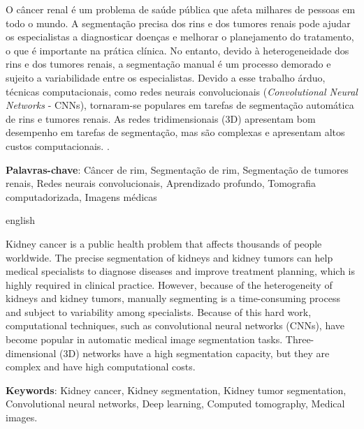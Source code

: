\documentclass[
	12pt,				%
	oneside,			%
	a4paper,			%
	english,			%
	french,				%
	spanish,			%
	brazil				%
	]{abntex2}
\begin{document}

\setlength{\absparsep}{18pt} %

\begin{resumo}

O câncer renal é um problema de saúde pública que afeta milhares de pessoas em todo o mundo. A segmentação precisa dos rins e dos tumores renais pode ajudar os especialistas a diagnosticar doenças e melhorar o planejamento do tratamento, o que é importante na prática clínica. No entanto, devido à heterogeneidade dos rins e dos tumores renais, a segmentação manual é um processo demorado e sujeito a variabilidade entre os especialistas. Devido a esse trabalho árduo, técnicas computacionais, como redes neurais convolucionais (\textit{Convolutional Neural Networks} - CNNs), tornaram-se populares em tarefas de segmentação automática de rins e tumores renais. As redes tridimensionais (3D) apresentam bom desempenho em tarefas de segmentação, mas são complexas e apresentam altos custos computacionais. .

\textbf{Palavras-chave}: Câncer de rim, Segmentação de rim, Segmentação de tumores renais, Redes neurais convolucionais, Aprendizado profundo, Tomografia computadorizada, Imagens médicas
\end{resumo}


\begin{resumo}[Abstract]
\begin{otherlanguage*}{english}

Kidney cancer is a public health problem that affects thousands of people worldwide. The precise segmentation of kidneys and kidney tumors can help medical specialists to diagnose diseases and improve treatment planning, which is highly required in clinical practice. However, because of the heterogeneity of kidneys and kidney tumors, manually segmenting is a time-consuming process and subject to variability among specialists. Because of this hard work, computational techniques, such as convolutional neural networks (CNNs), have become popular in automatic medical image segmentation tasks. Three-dimensional (3D) networks have a high segmentation capacity, but they are complex and have high computational costs. 
 
\textbf{Keywords}: Kidney cancer, Kidney segmentation, Kidney tumor segmentation, Convolutional neural networks, Deep learning, Computed tomography, Medical images.
\end{otherlanguage*}
\end{resumo}
\end{document}
